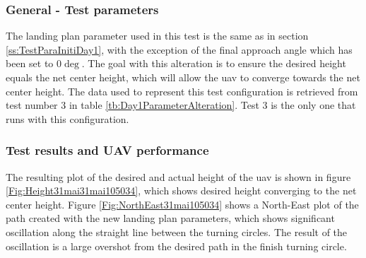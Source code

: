 \subsubsection{General - Test parameters}
The landing plan parameter used in this test is the same as in section \ref{ss:TestParaInitiDay1}, with the exception of the final approach angle which has been set to $0 \deg$. The goal with this alteration is to ensure the desired height equals the net center height, which will allow the \gls{uav} to converge towards the net center height. The data used to represent this test configuration is retrieved from test number $3$ in table \ref{tb:Day1ParameterAlteration}. Test $3$ is the only one that runs with this configuration.
\subsubsection{Test results and UAV performance}
 The resulting plot of the desired and actual height of the \gls{uav} is shown in figure \ref{Fig:Height31mai31mai105034}, which shows desired height converging to the net center height. Figure \ref{Fig:NorthEast31mai105034} shows a North-East plot of the path created with the new landing plan parameters, which shows significant oscillation along the straight line between the turning circles. The result of the oscillation is a large overshot from the desired path in the finish turning circle.
 \newpage
